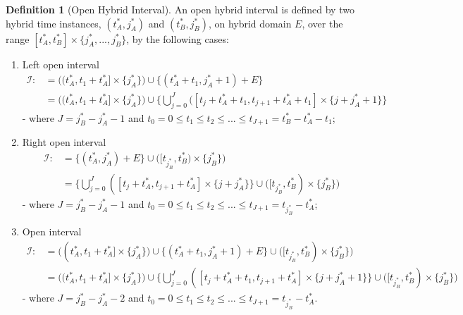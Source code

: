 \documentclass{article}
\theoremstyle{definition}
\newtheorem{definition}{Definition}[section]
\begin{document}
\begin{definition}[Open Hybrid Interval]
An open hybrid interval is defined by two hybrid time instances,
$(t^*_A,j^*_A)$ and $(t^*_B,j^*_B)$, on hybrid domain $E$, over the
range $[t^*_A, t^*_B]\times\{j^*_A,..., j^*_B\}$, by the following cases:

\begin{enumerate}

    \item Left open interval
    \begin{align}
        \mathcal{I} :&= \bigg( (t^*_A, t_1 + t^*_A] \times \{j^*_A\} \bigg) \cup 
        \bigg\{ (t^*_A + t_1,j^*_A + 1) + E\bigg\} \\
        &= \bigg( (t^*_A, t_1 +
        t^*_A] \times \{j^*_A\} \bigg) \cup 
        \bigg\{ \bigcup\limits_{j=0}^{J}
            ([t_j+t^*_A+t_1,t_{j+1}+t^*_A+t_1] \times \{j+j^*_A+1\}\bigg
            \}\nonumber 
    \end{align}
    - where $J = j^*_B - j^*_A - 1$ and $t_0 = 0 \leq t_1 \leq t_2 \leq ... \leq
    t_{J+1} = t^*_B - t^*_A - t_1$;

    \item Right open interval
    \begin{align}
        \mathcal{I} :&=  \bigg\{(t^*_A,j^*_A) + E\bigg\} \cup \bigg(
        [t_{j^*_B}, t^*_B) \times \{j^*_B\}\bigg)\\
        &= \bigg\{ \bigcup\limits_{j=0}^{J} ([t_j+t^*_A,t_{j+1}+t^*_A]
            \times \{j+j^*_A\}\bigg\} 
                         \cup \bigg(
                            [t_{j^*_B}, t^*_B) \times
                        \{j^*_B\}\bigg)\nonumber
    \end{align}
    - where $J = j^*_B - j^*_A - 1$ and $t_0 = 0 \leq t_1 \leq t_2 \leq ...
    \leq t_{J+1} = t_{j^*_B} - t^*_A$; 


    \item Open interval
     \begin{align}
        \mathcal{I} :&=  \bigg( (t^*_A, t_1 + t^*_A] \times \{j^*_A\} \bigg) \cup
        \bigg\{ (t^*_A + t_1,j^*_A + 1) + E\bigg\}
        \cup \bigg( [t_{j^*_B}, t^*_B) \times \{j^*_B\}\bigg) \\
        &=  
        \bigg( (t^*_A, t_1 + t^*_A] \times \{j^*_A\} \bigg) \cup
        \bigg\{ \bigcup\limits_{j=0}^{J} ([t_j+t^*_A+t_1,t_{j+1}+t^*_A] \times
            \{j+j^*_A+1\} \bigg\}
        \cup \bigg( [t_{j^*_B}, t^*_B) \times \{j^*_B\}\bigg) \nonumber 
     \end{align}
    - where $J = j^*_B - j^*_A -2$ and $t_0 = 0 \leq t_1 \leq t_2 \leq ...
    \leq t_{J+1} = t_{j^*_B} - t^*_A$. 


\end{enumerate}
\end{definition}
\end{document}
